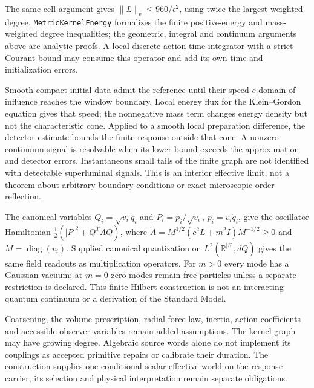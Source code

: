 The same cell argument gives $\|L\|_v\le960/\epsilon^2$, using twice the
largest weighted degree. \texttt{MetricKernelEnergy} formalizes the finite
positive-energy and mass-weighted degree inequalities; the geometric,
integral and continuum arguments above are analytic proofs. A local
discrete-action time integrator with a strict Courant bound may consume
this operator and add its own time and initialization errors.

Smooth compact initial data admit the reference until their speed-$c$
domain of influence reaches the window boundary. Local energy flux for the
Klein--Gordon equation gives that speed; the nonnegative mass term changes
energy density but not the characteristic cone. Applied to a smooth local
preparation difference, the detector estimate bounds the finite response
outside that cone. A nonzero continuum signal is resolvable when its lower
bound exceeds the approximation and detector errors. Instantaneous small
tails of the finite graph are not identified with detectable superluminal
signals. This is an interior effective limit, not a theorem about arbitrary
boundary conditions or exact microscopic order reflection.

The canonical variables $Q_i=\sqrt{v_i}q_i$ and
$P_i=p_i/\sqrt{v_i}$, $p_i=v_i\dot q_i$, give the oscillator Hamiltonian
$\frac12(|P|^2+Q^T\widetilde A Q)$, where
$\widetilde A=M^{1/2}(c^2L+m^2I)M^{-1/2}\ge0$ and
$M=\operatorname{diag}(v_i)$. Supplied canonical quantization on
$L^2(\mathbb R^{|S|},dQ)$ gives the same field readouts as multiplication
operators. For $m>0$ every mode has a Gaussian vacuum; at $m=0$ zero
modes remain free particles unless a separate restriction is declared.
This finite Hilbert construction is not an interacting quantum continuum
or a derivation of the Standard Model.

Coarsening, the volume prescription, radial force law, inertia, action
coefficients and accessible observer variables remain added assumptions.
The kernel graph may have growing degree. Algebraic source words alone
do not implement its couplings as accepted primitive repairs or calibrate
their duration. The construction supplies one conditional scalar effective
world on the response carrier; its selection and physical interpretation
remain separate obligations.

